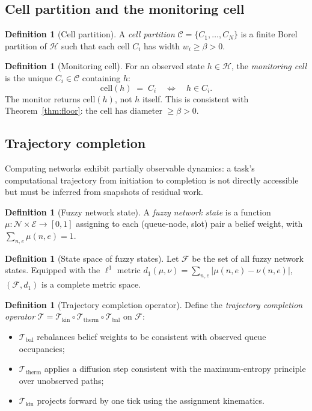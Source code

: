 \documentclass[11pt,twocolumn,a4paper]{article}
\theoremstyle{plain}
\theoremstyle{definition}
\newtheorem{definition}[theorem]{Definition}
\theoremstyle{remark}
\newcommand{\N}{\mathcal{N}}
\newcommand{\E}{\mathcal{E}}
\newcommand{\T}{\mathcal{T}}
\renewcommand{\H}{\mathcal{H}}
\newcommand{\C}{\mathcal{C}}
\newcommand{\F}{\mathcal{F}}
\newcommand{\floor}{\beta}
\newcommand{\cell}{\mathrm{cell}}
\begin{document}
\subsection{Cell partition and the monitoring cell}

\begin{definition}[Cell partition]
\label{def:cellpartition}
A \emph{cell partition} $\C = \{C_1, \ldots, C_N\}$ is a finite Borel partition of $\H$ such that each cell $C_i$ has width $w_i \geq \floor > 0$.
\end{definition}

\begin{definition}[Monitoring cell]
\label{def:moncell}
For an observed state $h \in \H$, the \emph{monitoring cell} is the unique $C_i \in \C$ containing $h$:
\[
  \cell(h) \;=\; C_i \quad \Leftrightarrow \quad h \in C_i.
\]
The monitor returns $\cell(h)$, not $h$ itself. This is consistent with Theorem~\ref{thm:floor}: the cell has diameter $\geq \floor > 0$.
\end{definition}

\subsection{Trajectory completion}

Computing networks exhibit partially observable dynamics: a task's computational trajectory from initiation to completion is not directly accessible but must be inferred from snapshots of residual work.

\begin{definition}[Fuzzy network state]
\label{def:fuzzy}
A \emph{fuzzy network state} is a function $\mu : \N \times \E \to [0,1]$ assigning to each (queue-node, slot) pair a belief weight, with $\sum_{n,e} \mu(n,e) = 1$.
\end{definition}

\begin{definition}[State space of fuzzy states]
\label{def:fuzzyspace}
Let $\F$ be the set of all fuzzy network states. Equipped with the $\ell^1$ metric $d_1(\mu, \nu) = \sum_{n,e} |\mu(n,e) - \nu(n,e)|$, $(\F, d_1)$ is a complete metric space.
\end{definition}

\begin{definition}[Trajectory completion operator]
\label{def:trajop}
Define the \emph{trajectory completion operator} $\T = \T_{\mathrm{kin}} \circ \T_{\mathrm{therm}} \circ \T_{\mathrm{bal}}$ on $\F$:
\begin{itemize}[nosep]
\item $\T_{\mathrm{bal}}$ rebalances belief weights to be consistent with observed queue occupancies;
\item $\T_{\mathrm{therm}}$ applies a diffusion step consistent with the maximum-entropy principle over unobserved paths;
\item $\T_{\mathrm{kin}}$ projects forward by one tick using the assignment kinematics.
\end{itemize}
\end{definition}
\end{document}
